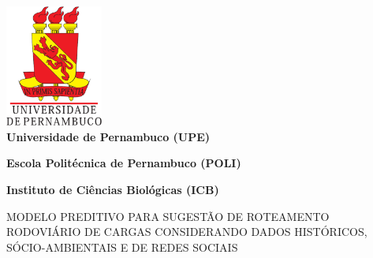 
\thispagestyle{empty}

\begin{center}

\includegraphics[height=40mm]{Figuras/Capa/brasao_upe2.eps}\\


{\textbf{Universidade de Pernambuco (UPE)}}%

{\textbf{Escola Politécnica de Pernambuco (POLI)}}%

{\textbf{Instituto de Ciências Biológicas (ICB)}} \\ \vspace{2ex}

\vspace{1ex}

\vspace{1.3in}

{\Large MODELO PREDITIVO PARA SUGESTÃO DE ROTEAMENTO RODOVIÁRIO DE CARGAS CONSIDERANDO DADOS HISTÓRICOS, SÓCIO-AMBIENTAIS E DE REDES SOCIAIS} \\ 

\vspace{0.3in}


\vspace{1.2ex}

\begin{center}


\end{center}
\end{center}
